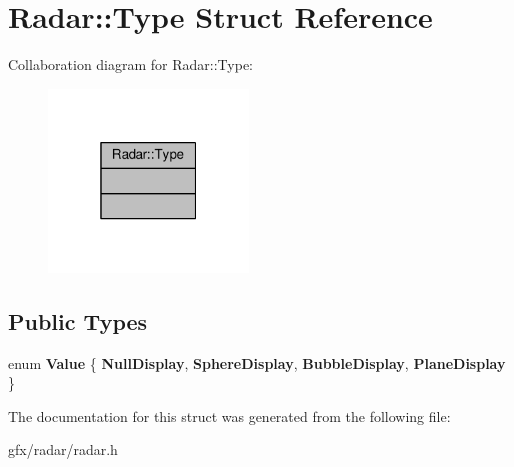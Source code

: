 \hypertarget{structRadar_1_1Type}{}\section{Radar\+:\+:Type Struct Reference}
\label{structRadar_1_1Type}


Collaboration diagram for Radar\+:\+:Type\+:
\nopagebreak
\begin{figure}[H]
\begin{center}
\leavevmode
\includegraphics[width=151pt]{d1/d5f/structRadar_1_1Type__coll__graph}
\end{center}
\end{figure}
\subsection*{Public Types}
\begin{DoxyCompactItemize}
\item 
enum {\bfseries Value} \{ {\bfseries Null\+Display}, 
{\bfseries Sphere\+Display}, 
{\bfseries Bubble\+Display}, 
{\bfseries Plane\+Display}
 \}\hypertarget{structRadar_1_1Type_a4909816cc5baccc75945b63624c027ae}{}\label{structRadar_1_1Type_a4909816cc5baccc75945b63624c027ae}

\end{DoxyCompactItemize}


The documentation for this struct was generated from the following file\+:\begin{DoxyCompactItemize}
\item 
gfx/radar/radar.\+h\end{DoxyCompactItemize}
